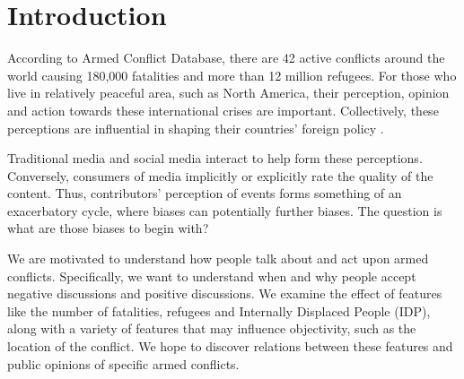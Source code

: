 \section{Introduction}
According to Armed Conflict Database, there are 42 active conflicts around the world causing 180,000 fatalities and more than 12 million refugees. For those who live in relatively peaceful area, such as North America, their perception, opinion and action towards these international crises are important. Collectively, these perceptions are influential in shaping their countries' foreign policy \cite{Gelpi2009}. 

Traditional media and social media interact to help form these perceptions. Conversely, consumers of media implicitly or explicitly rate the quality of the content. Thus, contributors' perception of events forms something of an exacerbatory cycle, where biases can potentially further biases. The question is what are those biases to begin with?

We are motivated to understand how people talk about and act upon armed conflicts. Specifically, we want to understand when and why people accept negative discussions and positive discussions. We examine the effect of features like the number of fatalities, refugees and Internally Displaced People (IDP),  along with a variety of features that may influence objectivity, such as the location of the conflict. We hope to discover relations between these features and public opinions of specific armed conflicts.
